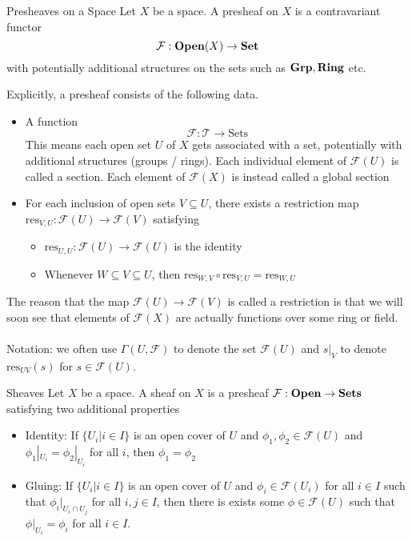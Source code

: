 \documentclass[a4paper]{article}
\begin{document}
\begin{defn}{Presheaves on a Space}{} Let $X$ be a space. A presheaf on $X$ is a contravariant functor $$\mathcal{F}:\bold{Open}(X)\to\bold{Set}$$ with potentially additional structures on the sets such as $\bold{Grp},\bold{Ring}$ etc. 
\end{defn}

Explicitly, a presheaf consists of the following data. 

\begin{itemize}
\item A function $$\mathcal{F}:\mathcal{T}\to\text{Sets}$$ This means each open set $U$ of $X$ gets associated with a set, potentially with additional structures (groups / rings). Each individual element of $\mathcal{F}(U)$ is called a section. Each element of $\mathcal{F}(X)$ is instead called a global section
\item For each inclusion of open sets $V\subseteq U$, there exists a restriction map $\text{res}_{V,U}:\mathcal{F}(U)\to\mathcal{F}(V)$
 satisfying
\begin{itemize}
\item $\text{res}_{U,U}:\mathcal{F}(U)\to\mathcal{F}(U)$ is the identity
\item Whenever $W\subseteq V\subseteq U$, then $\text{res}_{W,V}\circ\text{res}_{V,U}=\text{res}_{W,U}$
\end{itemize}
\end{itemize}

The reason that the map $\mathcal{F}(U)\to\mathcal{F}(V)$ is called a restriction is that we will soon see that elements of $\mathcal{F}(X)$ are actually functions over some ring or field. \\~\\
Notation: we often use $\Gamma(U,\mathcal{F})$ to denote the set $\mathcal{F}(U)$ and $s|_V$ to denote $\text{res}_{UV}(s)$ for $s\in\mathcal{F}(U)$. 

\begin{defn}{Sheaves}{} Let $X$ be a space. A sheaf on $X$ is a presheaf $\mathcal{F}:\bold{Open}\to\bold{Sets}$ satisfying two additional properties
\begin{itemize}
\item Identity: If $\{U_i|i\in I\}$ is an open cover of $U$ and $\phi_1,\phi_2\in\mathcal{F}(U)$ and $\phi_1|_{U_i}=\phi_2|_{U_i}$ for all $i$, then $\phi_1=\phi_2$
\item Gluing: If $\{U_i|i\in I\}$ is an open cover of $U$ and $\phi_i\in\mathcal{F}(U_i)$ for all $i\in I$ such that $\phi_i|_{U_i\cap U_j}$ for all $i,j\in I$, then there is exists some $\phi\in\mathcal{F}(U)$ such that $\phi|_{U_i}=\phi_i$ for all $i\in I$. 
\end{itemize}
\end{defn}
\end{document}
